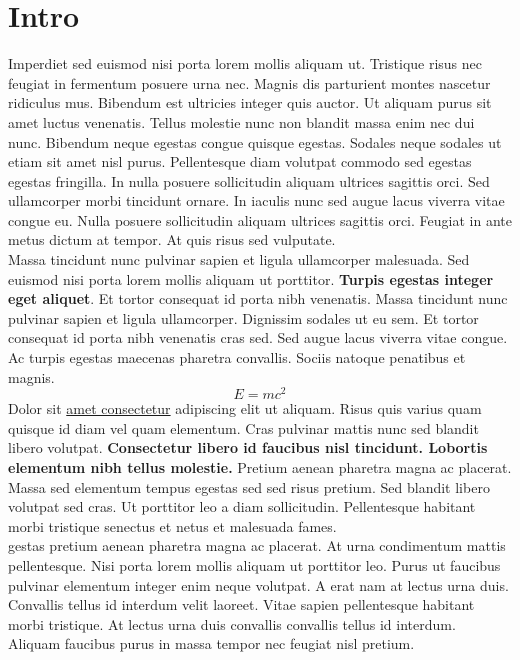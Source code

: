 \documentclass[12pt,a4paper]{article}
\begin{document}
	\section{Intro}
	Imperdiet sed euismod nisi porta lorem mollis aliquam ut. Tristique risus nec feugiat in fermentum posuere urna nec. Magnis dis parturient montes nascetur ridiculus mus. Bibendum est ultricies integer quis auctor. Ut aliquam purus sit amet luctus venenatis. Tellus molestie nunc non blandit massa enim nec dui nunc. Bibendum neque egestas congue quisque egestas. Sodales neque sodales ut etiam sit amet nisl purus. Pellentesque diam volutpat commodo sed egestas egestas fringilla. In nulla posuere sollicitudin aliquam ultrices sagittis orci. Sed ullamcorper morbi tincidunt ornare. In iaculis nunc sed augue lacus viverra vitae congue eu. Nulla posuere sollicitudin aliquam ultrices sagittis orci. Feugiat in ante metus dictum at tempor. At quis risus sed vulputate. \\Massa tincidunt nunc pulvinar sapien et ligula ullamcorper malesuada. Sed euismod nisi porta lorem mollis aliquam ut porttitor.  \textbf{Turpis egestas integer eget aliquet}. Et tortor consequat id porta nibh venenatis. Massa tincidunt nunc pulvinar sapien et ligula ullamcorper. Dignissim sodales ut eu sem. Et tortor consequat id porta nibh venenatis cras sed. Sed augue lacus viverra vitae congue. Ac turpis egestas maecenas pharetra convallis. Sociis natoque penatibus et magnis.
	\[E=mc^2\]
	Dolor sit \underline{amet consectetur} adipiscing elit ut aliquam. Risus quis varius quam quisque id diam vel quam elementum. Cras pulvinar mattis nunc sed blandit libero volutpat.  \textbf{Consectetur libero id faucibus nisl tincidunt. Lobortis elementum nibh tellus molestie.}  Pretium aenean pharetra magna ac placerat. Massa sed elementum tempus egestas sed sed risus pretium. Sed blandit libero volutpat sed cras. Ut porttitor leo a diam sollicitudin. Pellentesque habitant morbi tristique senectus et netus et malesuada fames. \\gestas pretium aenean pharetra magna ac placerat. At urna condimentum mattis pellentesque. Nisi porta lorem mollis aliquam ut porttitor leo. Purus ut faucibus pulvinar elementum integer enim neque volutpat.  A erat nam at lectus urna duis. Convallis tellus id interdum velit laoreet. Vitae sapien pellentesque habitant morbi tristique. At lectus urna duis convallis convallis tellus id interdum. Aliquam faucibus purus in massa tempor nec feugiat nisl pretium.
\end{document}
